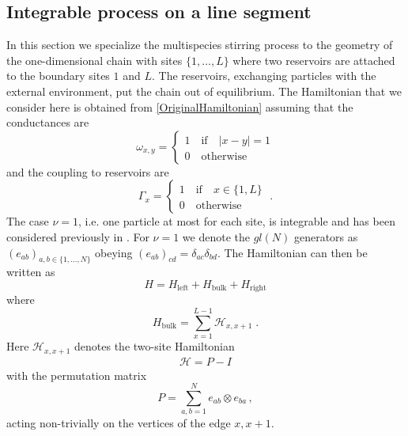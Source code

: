 \documentclass[10pt]{article}
\numberwithin{equation}{section}
\numberwithin{equation}{subsection}
\newcommand{\id}{I}
\newcommand{\dt}{\;.}
\begin{document}
\subsection{Integrable process on a line segment}\label{subsection-description-process-LINE}
In this section we specialize the multispecies stirring process to the geometry of the one-dimensional chain with sites $\{1,\ldots,L\}$ where two reservoirs are attached to the boundary sites $1$ and $L$.  The reservoirs, exchanging particles with the external environment, put the chain out of equilibrium.  The  Hamiltonian that we consider here is obtained from \eqref{OriginalHamiltonian} assuming that the conductances are
\begin{equation}
	\omega_{x,y}=\begin{cases}
		1 \quad \text{if}\quad |x-y|=1\\
		0\quad \text{otherwise}
	\end{cases}
\end{equation}
and the coupling to reservoirs are
\begin{equation}
	\Gamma_{x}=\begin{cases}
		1\quad \text{if} \quad x\in \{1,L\}\\
		0\quad \text{otherwise}
	\end{cases}\dt
\end{equation}
The case $\nu=1$, i.e. one particle at most for each site, is integrable and has been considered previously in \cite{vanicat2017exact}. 
For  $\nu=1$ we denote the ${gl}(N)$  generators   as  $(e_{ab})_{a,b\in\{1,\ldots,N\}}$ obeying $(e_{ab})_{cd}=\delta_{ac}\delta_{bd}$.
The Hamiltonian can then be written as
\begin{equation}\label{hamiltonian}
	H=H_{\text{left}}+H_{\text{bulk}}+H_{\text{right}}
\end{equation}
where
\begin{equation}
	H_{\text{bulk}}=\sum_{x=1}^{L-1}\mathcal{H}_{x,x+1}\dt
\end{equation}
Here $\mathcal{H}_{x,x+1}$  denotes  the two-site Hamiltonian 
\begin{equation}\label{H-corsivo}
	\begin{split}
		\mathcal{H}=P-\id
	\end{split}
\end{equation}
with the permutation matrix
\begin{equation}
	P=\sum_{a,b=1}^Ne_{ab}\otimes e_{ba}\,,
\end{equation} 
acting non-trivially on the vertices of the edge $x,x+1$.
\end{document}
